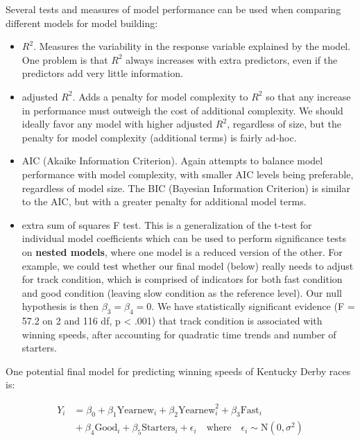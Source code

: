 \documentclass[
]{krantz}
\providecommand{\tightlist}{%
  \setlength{\itemsep}{0pt}\setlength{\parskip}{0pt}}
\begin{document}
Several tests and measures of model performance can be used when comparing different models for model building:

\begin{itemize}
\tightlist
\item
  \(R^2\).  Measures the variability in the response variable explained by the model. One problem is that \(R^2\) always increases with extra predictors, even if the predictors add very little information.
\item
  adjusted \(R^2\).  Adds a penalty for model complexity to \(R^2\) so that any increase in performance must outweigh the cost of additional complexity. We should ideally favor any model with higher adjusted \(R^2\), regardless of size, but the penalty for model complexity (additional terms) is fairly ad-hoc.
\item
  AIC (Akaike Information Criterion).  Again attempts to balance model performance with model complexity, with smaller AIC levels being preferable, regardless of model size. The BIC (Bayesian Information Criterion)  is similar to the AIC, but with a greater penalty for additional model terms.
\item
  extra sum of squares F test. This is a generalization of the t-test for individual model coefficients which can be used to perform significance tests on \textbf{nested models},  where one model is a reduced version of the other. For example, we could test whether our final model (below) really needs to adjust for track condition, which is comprised of indicators for both fast condition and good condition (leaving slow condition as the reference level). Our null hypothesis is then \(\beta_{3}=\beta_{4}=0\). We have statistically significant evidence (F = 57.2 on 2 and 116 df, p \textless{} .001) that track condition is associated with winning speeds, after accounting for quadratic time trends and number of starters.
\end{itemize}

One potential final model for predicting winning speeds of Kentucky Derby races is:

\begin{equation}
\begin{split}
 Y_{i}&=\beta_{0}+\beta_{1}\textrm{Yearnew}_{i}+\beta_{2}\textrm{Yearnew}^2_{i}+\beta_{3}\textrm{Fast}_{i}\\
      &{}+\beta_{4}\textrm{Good}_{i}+\beta_{5}\textrm{Starters}_{i}+\epsilon_{i}\quad 
      \textrm{where}\quad \epsilon_{i}\sim \textrm{N}(0,\sigma^2)
\end{split}
\label{eq:model0}
\end{equation}
\end{document}
